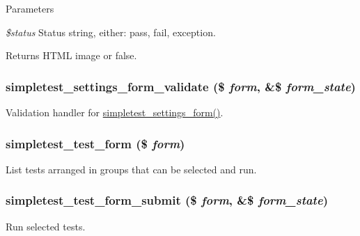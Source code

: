 \begin{DoxyParams}{Parameters}
\item[{\em \$status}]Status string, either: pass, fail, exception. \end{DoxyParams}
\begin{DoxyReturn}{Returns}
HTML image or false. 
\end{DoxyReturn}
\hypertarget{simpletest_8pages_8inc_a6ecec99e6260d79bc3a8c0f861da4d9e}{
\subsubsection[{simpletest\_\-settings\_\-form\_\-validate}]{\setlength{\rightskip}{0pt plus 5cm}simpletest\_\-settings\_\-form\_\-validate (\$ {\em form}, \/  \&\$ {\em form\_\-state})}}
\label{simpletest_8pages_8inc_a6ecec99e6260d79bc3a8c0f861da4d9e}
Validation handler for \hyperlink{group__forms_gaf74d9bfea1d65a5435e45a36084d10df}{simpletest\_\-settings\_\-form()}. \hypertarget{simpletest_8pages_8inc_a4118469154c4614c80157667a553ec23}{
\subsubsection[{simpletest\_\-test\_\-form}]{\setlength{\rightskip}{0pt plus 5cm}simpletest\_\-test\_\-form (\$ {\em form})}}
\label{simpletest_8pages_8inc_a4118469154c4614c80157667a553ec23}
List tests arranged in groups that can be selected and run. \hypertarget{simpletest_8pages_8inc_ae93012096feaf92ea177eaf496e51356}{
\subsubsection[{simpletest\_\-test\_\-form\_\-submit}]{\setlength{\rightskip}{0pt plus 5cm}simpletest\_\-test\_\-form\_\-submit (\$ {\em form}, \/  \&\$ {\em form\_\-state})}}
\label{simpletest_8pages_8inc_ae93012096feaf92ea177eaf496e51356}
Run selected tests. 